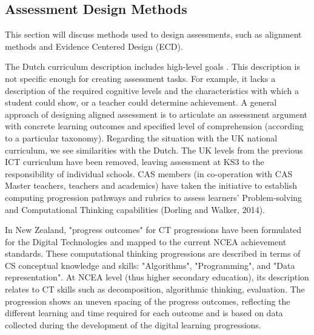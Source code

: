 


\subsection{Assessment Design Methods}
This section will discuss methods used to design assessments, such as alignment methods and Evidence Centered Design (ECD).


The Dutch curriculum description includes high-level goals \cite{Barendsen2016}. This description is not specific enough for creating assessment tasks. For example, it lacks a description of the required cognitive levels and the characteristics with which a student could show, or a teacher could determine achievement. A general approach of designing aligned assessment is to articulate an assessment argument with concrete learning outcomes and specified level of comprehension (according to a particular taxonomy)\cite{biggs1996}. Regarding the situation with the UK national curriculum, we see similarities with the Dutch. The UK levels from the previous ICT curriculum have been removed, leaving assessment at KS3 to the responsibility of individual schools. CAS members (in co-operation with CAS Master teachers, teachers and academics) have taken the initiative to establish computing progression pathways and rubrics to assess learners' Problem-solving and Computational Thinking capabilities (Dorling and Walker, 2014).


In New Zealand, "progress outcomes" for CT progressions have been formulated for the Digital Technologies and mapped to the current NCEA achievement standards. These computational thinking progressions are described in terms of CS conceptual knowledge and skills: "Algorithms", "Programming", and "Data representation". At NCEA level (thus higher secondary education), its description relates to CT skills such as decomposition, algorithmic thinking, evaluation. The progression shows an uneven spacing of the progress outcomes, reflecting the different learning and time required for each outcome and is based on data collected during the development of the digital learning progressions.

%
%


